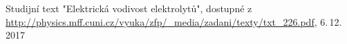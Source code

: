 \documentclass[0-protokol.tex]{subfiles}
\begin{document}
\begin{thebibliography}{}

Studijní text "Elektrická vodivost elektrolytů", dostupné z\\ \url{http://physics.mff.cuni.cz/vyuka/zfp/_media/zadani/texty/txt_226.pdf}, 6.\,12.\,2017

\end{thebibliography}
\end{document}
